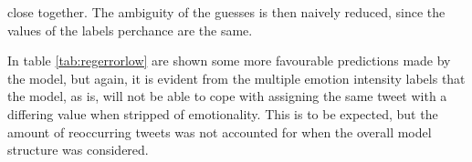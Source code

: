  close together. The ambiguity of the guesses is then naively reduced, since the values of the labels perchance are the same.\\
\begin{table}[H]
\caption{Tweets and their corresponding gold intensity scores, good predictions}
\label{tab:regerrorlow}
\end{table}
In table \ref{tab:regerrorlow} are shown some more favourable predictions made by the model, but again, it is evident from the multiple emotion intensity labels that the model, as is, will not be able to cope with assigning the same tweet with a differing value when stripped of emotionality. This is to be expected, but the amount of reoccurring tweets was not accounted for when the overall model structure was considered.

